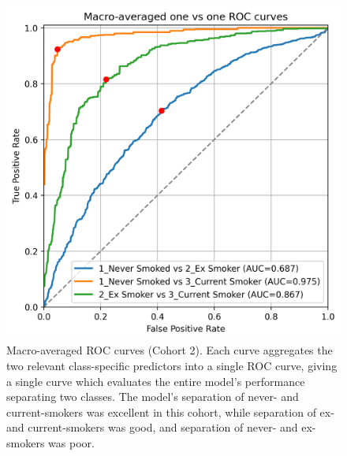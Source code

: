 \documentclass[draft]{article} %
\begin{document}
\begin{figure}[p]
    \centering
    \includegraphics[width=0.7\linewidth]{cohort2/test_macro_ovo_roc.png}
    \caption[Macro-averaged ROC curves (Cohort 2)]{Macro-averaged ROC curves (Cohort 2). Each curve aggregates the two relevant class-specific predictors into a single ROC curve, giving a single curve which evaluates the entire model's performance separating two classes. The model's separation of never- and current-smokers was excellent in this cohort, while separation of ex- and current-smokers was good, and separation of never- and ex-smokers was poor.}
    \label{fig:cohort2-macro-rocs}
\end{figure}
\end{document}
